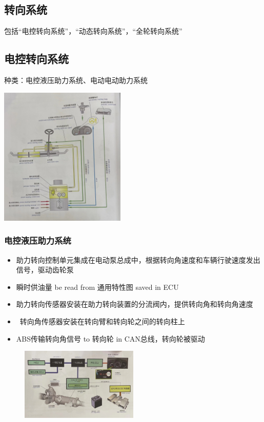 \subsection{转向系统}
	包括“电控转向系统”，“动态转向系统”，“全轮转向系统”
	
\subsection{电控转向系统}
	种类：电控液压助力系统、电动电动助力系统
	\begin{center}
		\includegraphics[width=0.45\textwidth]{5-6}
	\end{center}

	\subsubsection{电控液压助力系统}
		\begin{itemize}
			\item  助力转向控制单元集成在电动泵总成中，根据转向角速度和车辆行驶速度发出信号，驱动齿轮泵
			
			\item  瞬时供油量 be read from 通用特性图 saved in ECU
			
			\item  助力转向传感器安装在助力转向装置的分流阀内，提供转向角和转向角速度
			
			\item   转向角传感器安装在转向臂和转向轮之间的转向柱上
			
			\item  ABS传输转向角信号 to 转向轮 in CAN总线，转向轮被驱动
		\end{itemize}
		\begin{figure}[htbp]
			\centering
			\includegraphics[width=0.5\textwidth]{5-7}
		\end{figure}
	
